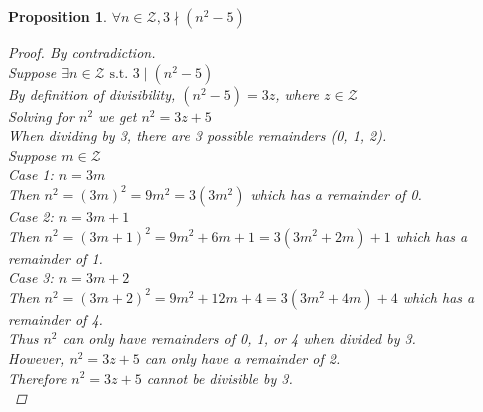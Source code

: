 \documentclass{article}
\newtheorem*{theorem}{Proposition}
\begin{document}

\begin{theorem}
    \(\forall n \in \mathcal{Z}, 3 \nmid (n^2 - 5)\)
    \begin{proof}
        By contradiction. \\
        Suppose \(\exists n \in \mathcal{Z} \text{ s.t. } 3 \mid (n^2 - 5)\) \\
        By definition of divisibility, \((n^2 - 5) = 3z\), where \(z \in \mathcal{Z}\) \\
        Solving for \(n^2\) we get \(n^2 = 3z + 5\) \\
        When dividing by 3, there are 3 possible remainders (0, 1, 2). \\
        Suppose \(m \in \mathcal{Z}\) \\
        Case 1: \(n = 3m\) \\
        \indent
        Then \(n^2 = (3m)^2 = 9m^2 = 3(3m^2)\) which has a remainder of 0. \\
        Case 2: \(n = 3m + 1\) \\
        \indent
        Then \(n^2 = (3m + 1)^2 = 9m^2 + 6m + 1 = 3(3m^2 + 2m) + 1\) which has a remainder of 1. \\
        Case 3: \(n = 3m + 2\) \\
        \indent
        Then \(n^2 = (3m + 2)^2 = 9m^2 + 12m + 4 = 3(3m^2 + 4m) + 4\) which has a remainder of 4. \\
        Thus \(n^2\) can only have remainders of 0, 1, or 4 when divided by 3. \\
        However, \(n^2 = 3z + 5\) can only have a remainder of 2. \\
        Therefore \(n^2 = 3z + 5\) cannot be divisible by 3. \\
    \end{proof}
\end{theorem}
\end{document}
